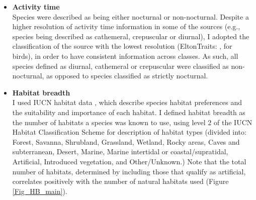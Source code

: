 \begin{itemize}
\item \textbf{Activity time}\\
Species were described as being either nocturnal or non-nocturnal. Despite a higher resolution of activity time information in some of the sources (e.g., species being described as cathemeral, crepuscular or diurnal), I adopted the classification of the source with the lowest resolution (EltonTraits: \citet{Wilman2014}, for birds), in order to have consistent information across classes. As such, all species defined as diurnal, cathemeral or crepuscular were classified as non-nocturnal, as opposed to species classified as strictly nocturnal.

\item \textbf{Habitat breadth}\\
I used IUCN habitat data \citep{IUCN2020}, which describe species habitat preferences and the suitability and importance of each habitat. I defined habitat breadth as the number of habitats a species was known to use, using level 2 of the IUCN Habitat Classification Scheme for description of habitat types (divided into: Forest, Savanna, Shrubland, Grassland, Wetland, Rocky areas, Caves and subterranean, Desert, Marine, Marine intertidal or coastal/supratidal, Artificial, Introduced vegetation, and Other/Unknown.) Note that the total number of habitats, determined by including those that qualify as artificial, correlates positively with the number of natural habitats used (Figure \ref{Fig_HB_main}).


\end{itemize}
